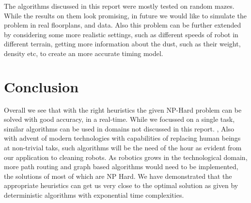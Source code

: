 \documentclass{article}
\begin{document}
The algorithms discussed in this report were mostly tested on random mazes. While the results on them look promising, in future we would like to simulate the problem in real floorplans, and data.
Also this problem can be further extended by considering some more realistic settings, such as different speeds of robot in different terrain, getting more information about the dust, such as their weight, density etc, to create an more accurate timing model.

\section{Conclusion}


Overall we see that with the right heuristics the given NP-Hard problem can be solved with good accuracy, in a real-time. While we focussed on a single task, similar algorithms can be used 
in domains not discussed in this report. \cite{apps1},\cite{apps2} Also with advent of modern technologies with capabilities of replacing human beings at non-trivial taks, such algorithms will be the need of the hour as evident from our application to cleaning robots.
As robotics grows in the technological domain, more path routing and graph based algorithms would need to be implemented, the solutions of most of which are NP Hard. We have demonstrated that 
the appropriate heuristics can get us very close to the optimal solution as given by deterministic algorithms with exponential time complexities.



\clearpage


\end{document}
